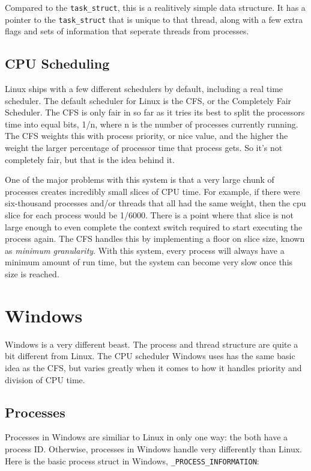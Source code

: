 \documentclass[10pt,letterpaper,onecolumn,draftclsnofoot]{IEEEtran}
\begin{document}
Compared to the \texttt{task\_struct}, this is a realitively simple data structure.
It has a pointer to the \texttt{task\_struct} that is unique to that thread,
along with a few extra flags and sets of information that seperate threads from
processes.

  \subsection{CPU Scheduling}
Linux ships with a few different schedulers by default, including a real time
scheduler.\cite{redhat2016} The default scheduler for Linux is the CFS, or
the Completely Fair Scheduler.
The CFS is only fair in so far as it tries its best to split the processors time
into equal bits, 1/n, where n is the number of processes currently running. The
CFS weights this with process priority, or nice value, and the higher the weight
the larger percentage of processor time that process gets. So it's not completely
fair, but that is the idea behind it.

One of the major problems with this system is that a very large chunk of processes
creates incredibly small slices of CPU time. For example, if there were six-thousand
processes and/or threads that all had the same weight, then the cpu slice for
each process would be 1/6000. There is a point where that slice is not large
enough to even complete the context switch required to start executing the process
again. The CFS handles this by implementing a floor on slice size, known as
\textit{minimum granularity}.\cite{robertlove2010} With this system, every process
will always have a minimum amount of run time, but the system can become very
slow once this size is reached.


\section{Windows}
Windows is a very different beast. The process and thread structure are quite a
bit different from Linux. The CPU scheduler Windows uses has the same basic idea
as the CFS, but varies greatly when it comes to how it handles priority and division
of CPU time.
  \subsection{Processes}
Processes in Windows are similiar to Linux in only one way: the both have a
process ID. Otherwise, processes in Windows handle very differently than Linux.
Here is the basic process struct in Windows, \texttt{\_PROCESS\_INFORMATION}:
\cite{msprocstruct2016}
\end{document}
